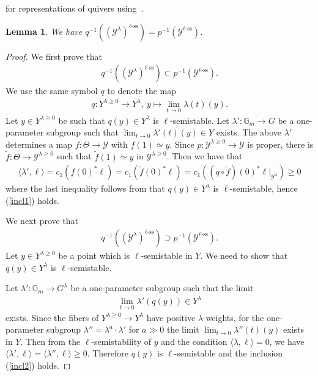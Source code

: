 \documentclass [11pt,oneside,a4paper,mathscr]{amsart}
\newtheorem{lemma}[thm]{Lemma}
\theoremstyle{definition}
\renewcommand{\geq}{\geqslant}
\newcommand{\Y}{\mathcal{Y}}
\begin{document}
for representations of quivers using~\cite[Lemma~3.4]{PTquiver}. 
\begin{lemma}\label{lem:cart2}
    We have $q^{-1}((\Y^{\lambda})^{\ell\text{-ss}})=p^{-1}(\Y^{\ell\text{-ss}})$.
\end{lemma}
\begin{proof}
We first prove that 
\begin{align}\label{incl1}q^{-1}((\Y^{\lambda})^{\ell\text{-ss}})\subset 
p^{-1}(\Y^{\ell\text{-ss}}).
\end{align}
We use the same symbol $q$ to denote the map \begin{align*}q\colon Y^{\lambda \geq 0} \to Y^{\lambda}, \
y\mapsto \lim_{t\to 0}\lambda(t)(y).\end{align*}
Let $y\in Y^{\lambda \geq 0}$ be such that 
$q(y) \in Y^{\lambda}$ is $\ell$-semistable. Let $\lambda' \colon \mathbb{G}_m \to G$
be a one-parameter subgroup such that $\lim_{t\to 0}\lambda'(t)(y) \in Y$ exists. 
The above $\lambda'$ determines a map 
$f\colon \Theta \to \Y$ with $f(1)\simeq y$. 
Since $p \colon \Y^{\lambda \geq 0} \to \Y$ is proper, there is 
$\widetilde{f} \colon \Theta \to \Y^{\lambda \geq 0}$ such that $\widetilde{f}(1)\simeq y$
in $\Y^{\lambda\geq 0}$. 
Then we have that 
\begin{align*}
\langle \lambda', \ell\rangle=
    c_1(f(0)^* \ell)=c_1(\widetilde{f}(0)^* \ell)=c_1((q\circ \widetilde{f})(0)^* \ell|_{\Y^{\lambda}}) \geq 0
\end{align*}
where the last inequality follows from that $q(y) \in Y^{\lambda}$ is 
$\ell$-semistable, hence (\ref{incl1}) holds. 

We next prove that 
\begin{align}\label{incl2}q^{-1}((\Y^{\lambda})^{\ell\text{-ss}})\supset 
p^{-1}(\Y^{\ell\text{-ss}}).
\end{align}
    Let $y\in Y^{\lambda \geq 0}$ be a point which is $\ell$-semistable in $Y$. 
    We need to show that $q(y) \in Y^{\lambda}$ is $\ell$-semistable. 
    
    Let $\lambda' \colon \mathbb{G}_m \to G^{\lambda}$ be a one-parameter subgroup 
    such that the limit
    \begin{align*}\lim_{t\to 0} \lambda'(q(y)) \in Y^{\lambda}
    \end{align*}exists. 
    Since the fibers of $Y^{\lambda\geq 0} \to Y^{\lambda}$ have positive $\lambda$-weights, 
    for the one-parameter subgroup $\lambda''=\lambda^a \cdot \lambda'$
for $a\gg 0$ the limit $\lim_{t\to 0}\lambda''(t)(y)$ exists in $Y$. 
Then from the $\ell$-semistability of $y$ and the condition $\langle \lambda, \ell \rangle =0$, 
we have 
$\langle \lambda', \ell\rangle=\langle \lambda'', \ell \rangle \geq 0$. 
Therefore $q(y)$ is $\ell$-semistable and the inclusion (\ref{incl2}) holds. 
\end{proof}
\end{document}
